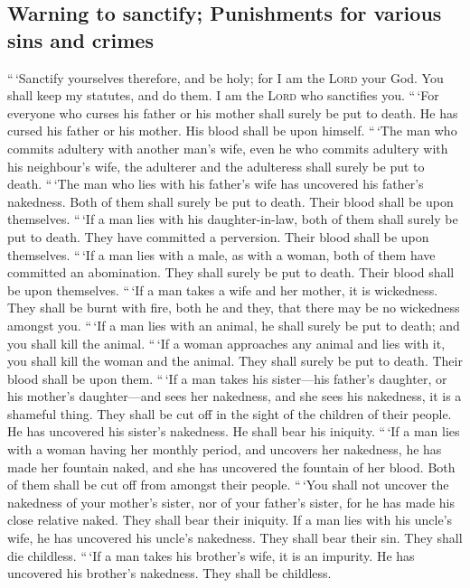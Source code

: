 \hypertarget{warning-to-sanctify-punishments-for-various-sins-and-crimes}{%
\subsection{Warning to sanctify; Punishments for various sins and
crimes}\label{warning-to-sanctify-punishments-for-various-sins-and-crimes}}

 ``\,`Sanctify yourselves therefore, and be holy; for I am
the \textsc{Lord} your God.  You shall keep my statutes,
and do them. I am the \textsc{Lord} who sanctifies you. 
``\,`For everyone who curses his father or his mother shall surely be
put to death. He has cursed his father or his mother. His blood shall be
upon himself.  ``\,`The man who commits adultery with
another man's wife, even he who commits adultery with his neighbour's
wife, the adulterer and the adulteress shall surely be put to death.
 ``\,`The man who lies with his father's wife has
uncovered his father's nakedness. Both of them shall surely be put to
death. Their blood shall be upon themselves.  ``\,`If a
man lies with his daughter-in-law, both of them shall surely be put to
death. They have committed a perversion. Their blood shall be upon
themselves.  ``\,`If a man lies with a male, as with a
woman, both of them have committed an abomination. They shall surely be
put to death. Their blood shall be upon themselves. 
``\,`If a man takes a wife and her mother, it is wickedness. They shall
be burnt with fire, both he and they, that there may be no wickedness
amongst you.  ``\,`If a man lies with an animal, he shall
surely be put to death; and you shall kill the animal. 
``\,`If a woman approaches any animal and lies with it, you shall kill
the woman and the animal. They shall surely be put to death. Their blood
shall be upon them.  ``\,`If a man takes his sister---his
father's daughter, or his mother's daughter---and sees her nakedness,
and she sees his nakedness, it is a shameful thing. They shall be cut
off in the sight of the children of their people. He has uncovered his
sister's nakedness. He shall bear his iniquity.  ``\,`If
a man lies with a woman having her monthly period, and uncovers her
nakedness, he has made her fountain naked, and she has uncovered the
fountain of her blood. Both of them shall be cut off from amongst their
people.  ``\,`You shall not uncover the nakedness of your
mother's sister, nor of your father's sister, for he has made his close
relative naked. They shall bear their iniquity.  If a man
lies with his uncle's wife, he has uncovered his uncle's nakedness. They
shall bear their sin. They shall die childless.  ``\,`If
a man takes his brother's wife, it is an impurity. He has uncovered his
brother's nakedness. They shall be childless.

